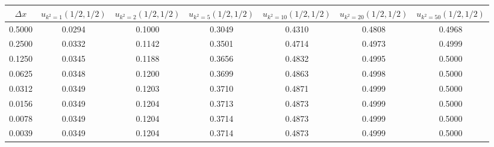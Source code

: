\begin{tabular}{|c|c|c|c|c|c|c|}
\hline
\textbf{$\Delta x$}&\textbf{$u_{k^2=1}(1/2, 1/2)$}&\textbf{$u_{k^2=2}(1/2, 1/2)$}&\textbf{$u_{k^2=5}(1/2, 1/2)$}&\textbf{$u_{k^2=10}(1/2, 1/2)$}&\textbf{$u_{k^2=20}(1/2, 1/2)$}&\textbf{$u_{k^2=50}(1/2, 1/2)$}\\\hline
0.5000&0.0294&0.1000&0.3049&0.4310&0.4808&0.4968\\\hline
0.2500&0.0332&0.1142&0.3501&0.4714&0.4973&0.4999\\\hline
0.1250&0.0345&0.1188&0.3656&0.4832&0.4995&0.5000\\\hline
0.0625&0.0348&0.1200&0.3699&0.4863&0.4998&0.5000\\\hline
0.0312&0.0349&0.1203&0.3710&0.4871&0.4999&0.5000\\\hline
0.0156&0.0349&0.1204&0.3713&0.4873&0.4999&0.5000\\\hline
0.0078&0.0349&0.1204&0.3714&0.4873&0.4999&0.5000\\\hline
0.0039&0.0349&0.1204&0.3714&0.4873&0.4999&0.5000\\\hline
\end{tabular}
